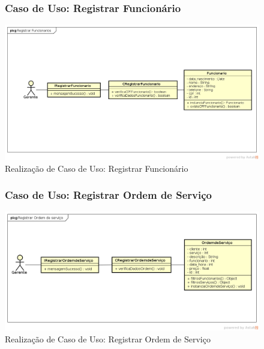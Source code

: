 \documentclass[
	12pt,				%
	openright,
	oneside,			%
	a4paper,			%
	chapter=TITLE,		%
	brazil				%
	]{abntex2}
\begin{document}
\begin{figure}[h!]

\subsubsection*{Caso de Uso: Registrar Funcionário}

	\caption{Realização de Caso de Uso: Registrar Funcionário}
	\begin{center}
	    \includegraphics[scale=0.5]{Arquivos/Projeto/R_registrar_funcionario}  
	\end{center}
\end{figure}






\begin{figure}[h!]

\subsubsection*{Caso de Uso: Registrar Ordem de Serviço}

	\caption{Realização de Caso de Uso: Registrar Ordem de Serviço}
	\begin{center}
	    \includegraphics[scale=0.5]{Arquivos/Projeto/R_registrar_ordem_servico}  
	\end{center}
\end{figure}
\end{document}

